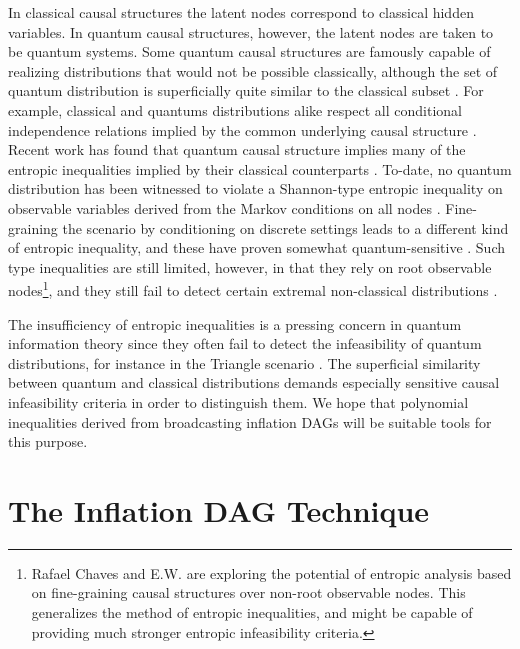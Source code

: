 In classical causal structures the latent nodes correspond to classical hidden variables. In quantum causal structures, however, the latent nodes are taken to be quantum systems. Some quantum causal structures are famously capable of realizing distributions that would not be possible classically, although the set of quantum distribution is superficially quite similar to the classical subset \cite{pusey2014gdag,fritz2012bell}. For example, classical and quantums distributions alike respect all conditional independence relations implied by the common underlying causal structure \cite{pusey2014gdag}. Recent work has found that quantum causal structure implies many of the entropic inequalities implied by their classical counterparts \cite{pusey2014gdag,Chaves2015infoquantum,ChavesNoSignalling}. To-date, no quantum distribution has been witnessed to violate a Shannon-type entropic inequality on observable variables derived from the Markov conditions on all nodes \cite{chaves2012entropic,fritz2012bell}. Fine-graining the scenario by conditioning on discrete settings leads to a different kind of entropic inequality, and these have proven somewhat quantum-sensitive \cite{braunstein1988entropic,SchumacherInequality,chaves2014novel}. Such \citet{braunstein1988entropic} type inequalities are still limited, however, in that they rely on root observable nodes\footnote{Rafael Chaves and E.W. are exploring the potential of entropic analysis based on fine-graining causal structures over non-root observable nodes. This generalizes the method of entropic inequalities, and might be capable of providing much stronger entropic infeasibility criteria.}, and they still fail to detect certain extremal non-classical distributions \cite{chaves2014novel,fritz2012bell}.  

The insufficiency of entropic inequalities is a pressing concern in quantum information theory since they often fail to detect the infeasibility of quantum distributions, for instance in the Triangle scenario \citep[Prob. 2.17]{fritz2012bell}. The superficial similarity between quantum and classical distributions demands especially sensitive causal infeasibility criteria in order to distinguish them. We hope that polynomial inequalities derived from broadcasting inflation DAGs will be suitable tools for this purpose.


\section{The Inflation DAG Technique}\label{sec:mainalgorithm}

